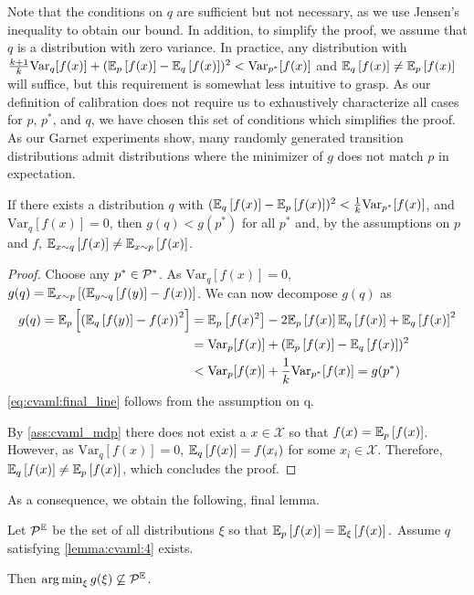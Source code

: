 Note that the conditions on $q$ are sufficient but not necessary, as we use Jensen's inequality to obtain our bound.
In addition, to simplify the proof, we assume that $q$ is a distribution with zero variance.
In practice, any distribution with $\frac{k + 1}{k}\mathrm{Var}_q[f(x)] + (\EEX{p}{f(x)} - \EEX{q}{f(x)})^2 < \mathrm{Var}_{p^*}[f(x)]$ and $\EEX{q}{f(x)} \not = \EEX{p}{f(x)}$ will suffice, but this requirement is somewhat less intuitive to grasp.
As our definition of calibration does not require us to exhaustively characterize all cases for $p$, $p^*$, and $q$, we have chosen this set of conditions which simplifies the proof. 
As our Garnet experiments show, many randomly generated transition distributions admit distributions where the minimizer of $g$ does not match $p$ in expectation.

\begin{lemma}\label{lemma:cvaml:4}
    If there exists a distribution $q$ with $(\EEX{q}{f(x)} - \EEX{p}{f(x)})^2 < \frac{1}{k} \mathrm{Var}_{p^*}[f(x)]$, and $\mathrm{Var}_{q}[f(x)] = 0$, then $g(q) < g(p^*)$ for all $p^*$ and, by the assumptions on $p$ and $f$, $\EEX{x\sim q}{f(x)} \neq \EEX{x \sim p}{f(x)}$.
\end{lemma}
\begin{proof}
    Choose any $p^*\in\P^*$. As $\mathrm{Var}_q[f(x)] = 0$, $g(q) = \EEX{x\sim p}{\left(\EEX{y\sim q}{f(y)} - f(x)\right)}$. We can now decompose $g(q)$ as 
    \begin{align}
        g(q) = \EEX{p}{\left(\EEX{q}{f(y)} - f(x)\right)^2} &= \EEX{p}{f(x)^2} - 2\EEX{p}{f(x)}\EEX{q}{f(x)} + \EEX{q}{f(x)}^2 \\
        & = \mathrm{Var}_p[f(x)] + (\EEX{p}{f(x)} - \EEX{q}{f(x)})^2 \\
        &< \mathrm{Var}_p[f(x)] + \frac{1}{k}\mathrm{Var}_{p^*}[f(x)] = g(p^*) \label{eq:cvaml:final_line}
    \end{align}
    \autoref{eq:cvaml:final_line} follows from the assumption on q.
    
    By \autoref{ass:cvaml_mdp} there does not exist a $x\in\mathcal{X}$ so that $f(x) = \EEX{p}{f(x)}$. However, as $\mathrm{Var}_q[f(x)] = 0$, $\EEX{q}{f(x)} = f(x_i)$ for some $x_i\in\mathcal{X}$. Therefore, $\EEX{q}{f(x)} \neq \EEX{p}{f(x)}$, which concludes the proof.
\end{proof}

As a consequence, we obtain the following, final lemma.

\begin{lemma}\label{lemma:cvaml:5}
    Let $\P^\mathbb{E}$ be the set of all distributions $\xi$ so that $\EEX{p}{f(x)} = \EEX{\xi}{f(x)}.$
    Assume $q$ satisfying \autoref{lemma:cvaml:4} exists.

    Then $\argmin_\xi g(\xi) \not \subseteq \P^\mathbb{E}$.
\end{lemma}


